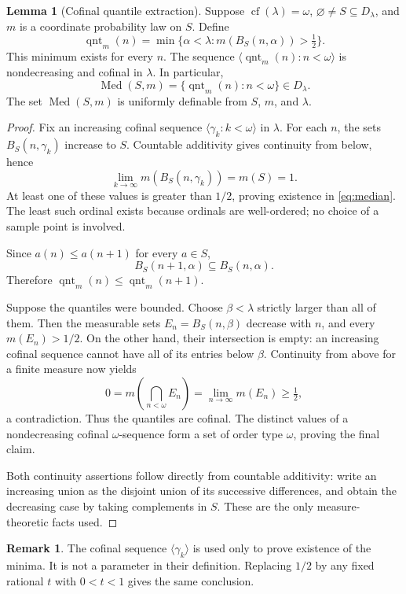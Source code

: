 \documentclass[11pt,letterpaper]{article}
\theoremstyle{definition}
\newtheorem{lemma}[definition]{Lemma}
\newtheorem{remark}[definition]{Remark}
\numberwithin{equation}{section}
\newcommand{\cf}{\operatorname{cf}}
\newcommand{\D}{D_\lambda}
\newcommand{\Med}{\operatorname{Med}}
\newcommand{\qnt}{\operatorname{qnt}}
\begin{document}
\begin{lemma}[Cofinal quantile extraction]\label{lem:median}
Suppose $\cf(\lambda)=\omega$, $\varnothing\ne S\subseteq\D$, and $m$ is a coordinate probability law on $S$. Define
\begin{equation}\label{eq:median}
 \qnt_m(n)=\min\{\alpha<\lambda:m(B_S(n,\alpha))>\tfrac12\}.
\end{equation}
This minimum exists for every $n$. The sequence $\langle\qnt_m(n):n<\omega\rangle$ is nondecreasing and cofinal in $\lambda$. In particular,
\[
 \Med(S,m)=\{\qnt_m(n):n<\omega\}\in\D.
\]
The set $\Med(S,m)$ is uniformly definable from $S$, $m$, and $\lambda$.
\end{lemma}
\begin{proof}
Fix an increasing cofinal sequence $\langle\gamma_k:k<\omega\rangle$ in $\lambda$. For each $n$, the sets $B_S(n,\gamma_k)$ increase to $S$. Countable additivity gives continuity from below, hence
\[
 \lim_{k\to\infty}m(B_S(n,\gamma_k))=m(S)=1.
\]
At least one of these values is greater than $1/2$, proving existence in \eqref{eq:median}. The least such ordinal exists because ordinals are well-ordered; no choice of a sample point is involved.

Since $a(n)\le a(n+1)$ for every $a\in S$,
\[
 B_S(n+1,\alpha)\subseteq B_S(n,\alpha).
\]
Therefore $\qnt_m(n)\le\qnt_m(n+1)$.

Suppose the quantiles were bounded. Choose $\beta<\lambda$ strictly larger than all of them. Then the measurable sets $E_n=B_S(n,\beta)$ decrease with $n$, and every $m(E_n)>1/2$. On the other hand, their intersection is empty: an increasing cofinal sequence cannot have all of its entries below $\beta$. Continuity from above for a finite measure now yields
\[
 0=m\left(\bigcap_{n<\omega}E_n\right)
   =\lim_{n\to\infty}m(E_n)\ge\tfrac12,
\]
a contradiction. Thus the quantiles are cofinal. The distinct values of a nondecreasing cofinal $\omega$-sequence form a set of order type $\omega$, proving the final claim.

Both continuity assertions follow directly from countable additivity: write an increasing union as the disjoint union of its successive differences, and obtain the decreasing case by taking complements in $S$. These are the only measure-theoretic facts used.
\end{proof}

\begin{remark}
The cofinal sequence $\langle\gamma_k\rangle$ is used only to prove existence of the minima. It is not a parameter in their definition. Replacing $1/2$ by any fixed rational $t$ with $0<t<1$ gives the same conclusion.
\end{remark}
\end{document}
